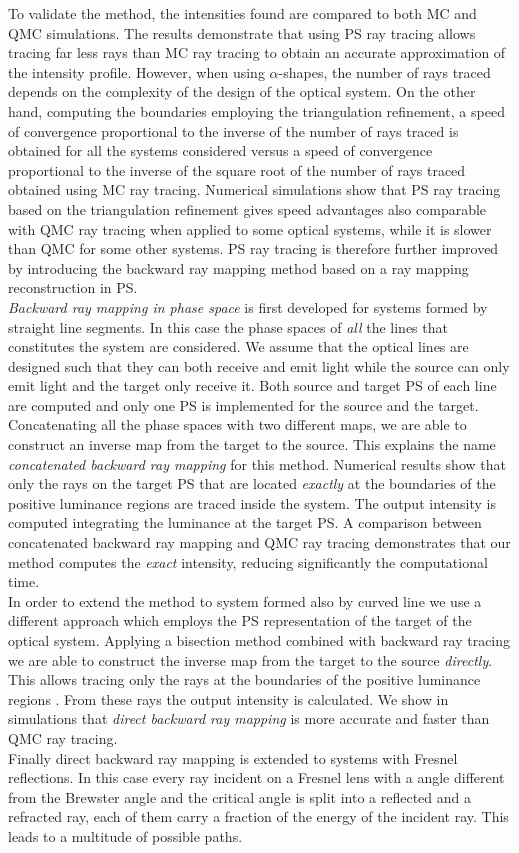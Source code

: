 To validate the method, the intensities found are compared to both MC and QMC simulations. The results demonstrate that using PS ray tracing allows tracing far less rays than MC ray tracing to obtain an accurate approximation of the intensity profile. However, when using $\alpha$-shapes, the number of rays traced depends on the complexity of the design of the optical system. On the other hand, computing the boundaries employing the triangulation refinement, a speed of convergence proportional to the inverse of the number of rays traced is obtained for all the systems considered versus a speed of convergence proportional to the inverse of the square root of the number of rays traced obtained using MC ray tracing. Numerical simulations show that PS ray tracing based on the triangulation refinement gives speed advantages also comparable with QMC ray tracing when applied to some optical systems, while it is slower than QMC for some other systems.
PS ray tracing is therefore further improved by introducing the backward ray mapping method based on a ray mapping reconstruction in PS. 
\\ \indent\textit{Backward ray mapping in phase space} is first developed for systems formed by straight line segments. In this case the phase spaces of \textit{all} the lines that constitutes the system are considered. We assume that the optical lines are designed such that they can both receive and emit light while the source can only emit light and the target only receive it. Both source and target PS of each line are computed and only one PS is implemented for the source and the target. Concatenating all the phase spaces with two different maps, we are able to construct an inverse map from the target to the source. This explains the name \textit{concatenated backward ray mapping} for this method. Numerical results show that only the rays on the target PS that are located \textit{exactly} at the boundaries of the positive luminance regions are traced inside the system. The output intensity is computed integrating the luminance at the target PS. A comparison between concatenated backward ray mapping and QMC ray tracing demonstrates that our method computes the \textit{exact} intensity, reducing significantly the computational time. \\ \indent In order to extend the method to system formed also by curved line we use a different approach which employs the PS representation of the target of the optical system. Applying a bisection method combined with backward ray tracing we are able to construct the inverse map from the target to the source \textit{directly}. This allows tracing only the rays at the boundaries of the positive luminance regions \cite{filosa2017inverse}. From these rays the output intensity is calculated. We show in simulations that \textit{direct backward ray mapping} is more accurate and faster than QMC ray tracing. \\ \indent Finally direct backward ray mapping is extended to systems with Fresnel reflections. In this case every ray incident on a Fresnel lens with a angle different from the Brewster angle and the critical angle is split into a reflected and a refracted ray, each of them carry a fraction of the energy of the incident ray. This leads to a multitude of possible paths. 
